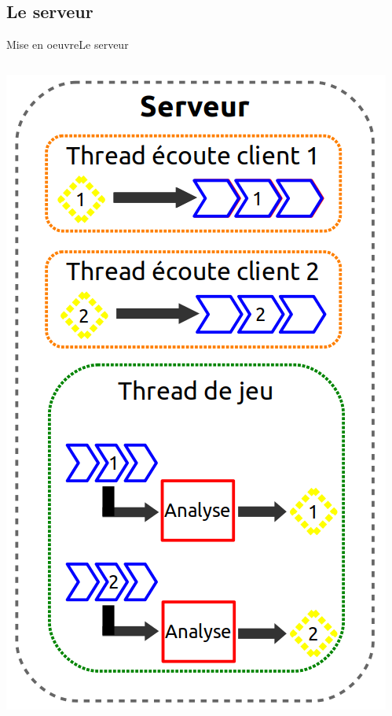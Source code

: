 \documentclass[french]{beamer}
\begin{document}
	\subsection{Le serveur}

	\begin{frame}{Mise en oeuvre}{Le serveur}
		\begin{columns}

			\begin{column}{0.4\textwidth}
				\begin{center}
					\includegraphics[scale=0.25]{img/serveur.png}
				\end{center}
			\end{column}



\end{columns}
\end{frame}
\end{document}
